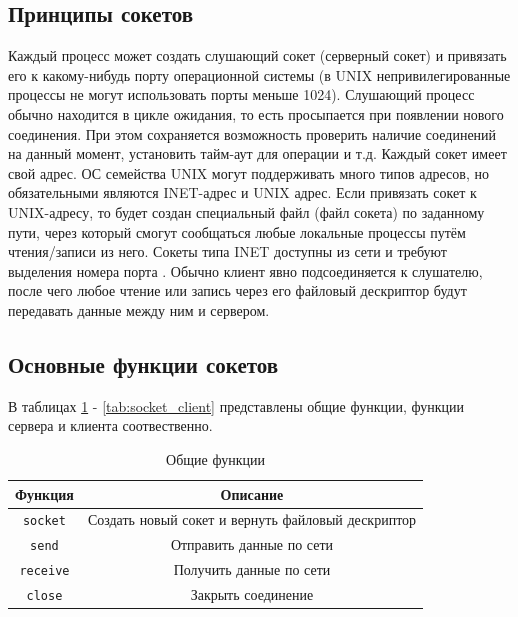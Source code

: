 \subsection{Принципы сокетов}

Каждый процесс может создать слушающий сокет (серверный сокет) и привязать его к какому-нибудь порту операционной системы (в UNIX непри­вилегированные процессы не могут использовать порты меньше 1024). Слуша­ющий процесс обычно находится в цикле ожидания, то есть просыпается при появлении нового соединения. При этом сохраняется возможность проверить наличие соединений на данный момент, установить тайм-аут для операции и т.д.
Каждый сокет имеет свой адрес. ОС семейства UNIX могут поддержи­вать много типов адресов, но обязательными являются INET-адрес и UNIX­ адрес. Если привязать сокет к UNIX-адресу, то будет создан специальный файл (файл сокета) по заданному пути, через который смогут сообщаться любые локальные процессы путём чтения/записи из него. Сокеты типа INET доступны из сети и требуют выделения номера порта \cite{socket-nets-programming}.
Обычно клиент явно подсоединяется к слушателю, после чего любое чтение или запись через его файловый дескриптор будут передавать данные между ним и сервером.

\subsection{Основные функции сокетов}

В таблицах \ref{tab:socket_main} - \ref{tab:socket_client} представлены общие функции, функции сервера и клиента соотвественно.

\begin{table}[h]
	\begin{center}
		\begin{tabular}{ |c|c| }
			\hline 
			Функция & Описание \\  \hline
			\texttt{socket} & Создать новый сокет и вернуть файловый дескриптор \\ \hline
			\texttt{send} & Отправить данные по сети \\ \hline 
			\texttt{receive} & Получить данные по сети \\ \hline 
			\texttt{close} & Закрыть соединение \\ \hline
		\end{tabular}
		\caption{\label{tab:socket_main} Общие функции}
	\end{center}
\end{table}

